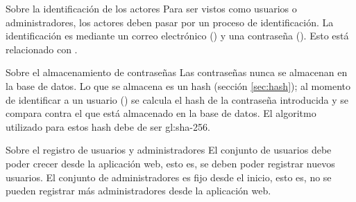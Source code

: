 {Sobre la identificación de los actores}
{
  Para ser vistos como usuarios o administradores, los actores deben
  pasar por un proceso de identificación. La identificación es mediante
  un correo electrónico () y una
  contraseña (). Esto está relacionado
  con .
}

{Sobre el almacenamiento de contraseñas}
{
  Las contraseñas nunca se almacenan en la base de datos. Lo que se almacena es
  un hash (sección \ref{sec:hash}); al momento de identificar a un usuario
  () se calcula el hash de la
  contraseña introducida y se compara contra el que está almacenado en la base
  de datos. El algoritmo utilizado para estos hash debe de ser \gls{gl:sha}-256.
}

{Sobre el registro de usuarios y administradores}
{
  El conjunto de usuarios debe poder crecer desde la aplicación web, esto es,
  se deben poder registrar nuevos usuarios. El conjunto de administradores es
  fijo desde el inicio, esto es, no se pueden registrar más administradores
  desde la aplicación web.
}
